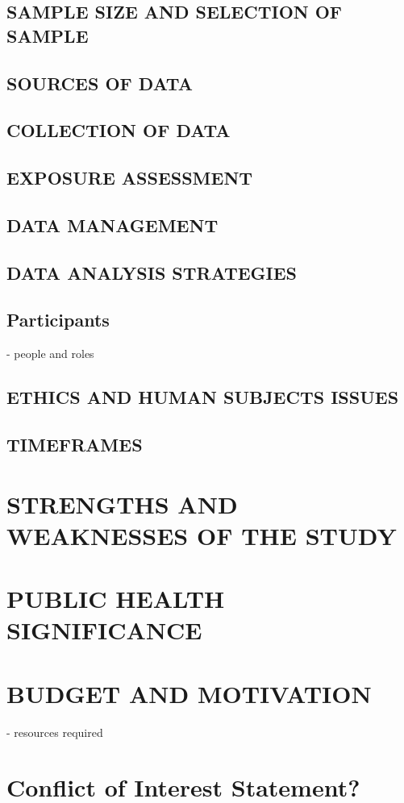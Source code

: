 \documentclass[a4paper, amsfonts, amssymb, amsmath, reprint, showkeys, nofootinbib, twoside]{revtex4-1}
\begin{document}
\subsection{SAMPLE SIZE AND SELECTION OF SAMPLE}
\subsection{SOURCES OF DATA}
\subsection{COLLECTION OF DATA}
\subsection{EXPOSURE ASSESSMENT}
\subsection{DATA MANAGEMENT}
\subsection{DATA ANALYSIS STRATEGIES}

\subsection{Participants}
- people and roles

\subsection{ETHICS AND HUMAN SUBJECTS ISSUES}
\subsection{TIMEFRAMES}

\section{STRENGTHS AND WEAKNESSES OF THE STUDY}
\section{PUBLIC HEALTH SIGNIFICANCE}
\section{BUDGET AND MOTIVATION}
- resources required

\section{Conflict of Interest Statement?}
\end{document}
